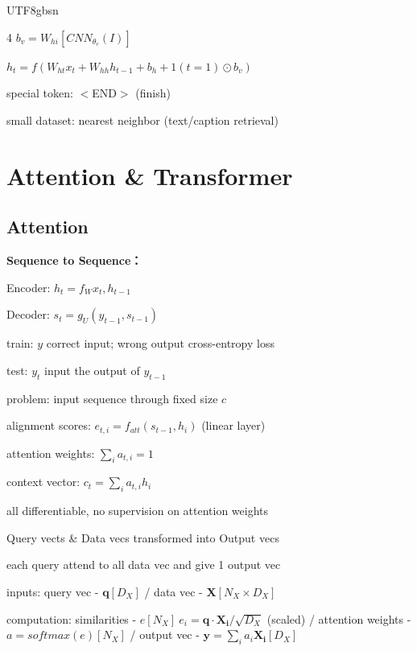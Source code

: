 \documentclass[8pt,a4paper]{extarticle}
\newcommand{\entry}[1]{\vspace{3pt}\noindent\textbf{#1：}}
\begin{document}
\begin{CJK*}{UTF8}{gbsn}
\begin{multicols*}{4}
$b_v = W_{hi}[CNN_{\theta_c}(I)]$

$h_t = f(W_{ht}x_t + W_{hh}h_{t-1} + b_h + 1(t=1) \odot b_v)$

special token: $<$END$>$ (finish)

small dataset: nearest neighbor (text/caption retrieval)

\section{Attention \& Transformer}

\subsection*{Attention}

\entry{Sequence to Sequence}

Encoder: $h_t = f_W{x_t, h_{t-1}}$

Decoder: $s_t = g_U(y_{t-1}, s_{t-1})$

train: $y$ correct input; wrong output cross-entropy loss

test: $y_t$ input the output of $y_{t-1}$

problem: input sequence through fixed size $c$

alignment scores: $e_{t,i} = f_{att}(s_{t-1}, h_i)$ (linear layer)

attention weights: $\sum_i a_{t,i} =1$

context vector: $c_t = \sum_i a_{t,i}h_i$

all differentiable, no supervision on attention weights

Query vects \& Data vecs transformed into Output vecs

each query attend to all data vec and give 1 output vec

inputs: query vec - $\mathbf{q}[D_X]$ / data vec - $\mathbf{X}[N_X \times D_X]$

computation: similarities - $e[N_X] \ e_{i} = \mathbf{q} \cdot \mathbf{X_i} / \sqrt{D_X}$ (scaled) / attention weights - $a = softmax(e) [N_X]$ / output vec - $\mathbf{y} = \sum_i a_i\mathbf{X_i} [D_X]$




\end{multicols*}
\end{CJK*}
\end{document}
